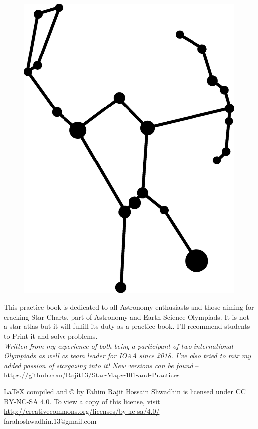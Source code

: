 \documentclass[a4paper,12pt]{extarticle}
\title{{\fontsize{30}{30}\selectfont\blue{\textbf{Star Charts 101 and Practices}}}}
\author{Fahim Rajit Hossain}
\date{\today}
\begin{document}
\begin{titlepage}
	\maketitle
	
	
\begin{figure}[H]
    \centering
    \includegraphics[width=0.35 \linewidth]{ori_1.eps}
\end{figure}
	
\vspace{1.5cm}
This practice book is dedicated to all Astronomy enthusiasts and those aiming for cracking Star Charts, part of Astronomy and Earth Science Olympiads. It is not a star atlas but it will fulfill its duty as a practice book. I'll recommend students to Print it and solve problems. \\

\textit{Written from my experience of both being a participant of two international Olympiads as well as team leader for IOAA since 2018. I've also tried to mix my added passion of stargazing into it! New versions can be found} -- \url{https://github.com/Rajit13/Star-Maps-101-and-Practices}

\vfill{\LaTeX  \;  compiled and  \copyright {} by \textsf{Fahim Rajit Hossain Shwadhin} is licensed under CC BY-NC-SA 4.0. To view a copy of this license, visit \url{http://creativecommons.org/licenses/by-nc-sa/4.0/} }\\

\hfill farahoshwadhin.13@gmail.com
\end{titlepage}

\tableofcontents

\clearpage
\begin{abstract}
	{\color{blue} This book delves into the fundamental knowledge necessary for computations associated with studying the sky and the positions of celestial objects, specifically in observational astronomy—focusing on naked-eye observation. It elucidates practical examples that progressively increase in complexity. Initially, memorizing all the constellations might seem daunting for enhanced observational skills. However, contrary to this belief, memorization isn't required. Instead, this book systematically guides you in understanding the sky, allowing you to approach challenges as if solving a puzzle.}
\end{abstract}
\end{document}
